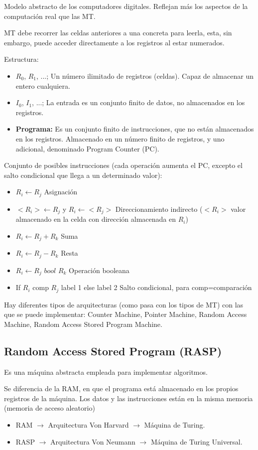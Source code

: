 Modelo abstracto de los computadores digitales. Reflejan más los aspectos de la computación real que las MT.

MT debe recorrer las celdas anteriores a una concreta para leerla, esta, sin embargo, puede acceder directamente a los registros al estar numerados.

Estructura:
\begin{itemize}
    \item $R_0$, $R_1$, ...; Un número ilimitado de registros (celdas). Capaz de almacenar un entero cualquiera.
    \item $I_0$, $I_1$, ...; La entrada es un conjunto finito de datos, no almacenados en los registros.
    \item \textbf{Programa:} Es un conjunto finito de instrucciones, que no están almacenados en los registros. Almacenado en un número finito de registros, y uno adicional, denominado Program Counter (PC).
\end{itemize}

Conjunto de posibles instrucciones (cada operación aumenta el PC, excepto el salto condicional que llega a un determinado valor):
\begin{itemize}
    \item $R_i \leftarrow R_j$ Asignación
    \item $<R_i> \leftarrow R_j$ y $R_i \leftarrow <R_j>$ Direccionamiento indirecto ($<R_i>$ valor almacenado en la celda con dirección almacenada en $R_i$)
    \item $R_i \leftarrow R_j + R_k$ Suma
    \item $R_i \leftarrow R_j - R_k$ Resta
    \item $R_i \leftarrow R_j \textit{ bool } R_k$ Operación booleana
    \item If $R_i$ comp $R_j$ label 1 else label 2 Salto condicional, para comp=comparación
\end{itemize}

Hay diferentes tipos de arquitecturas (como pasa con los tipos de MT) con las que se puede implementar: Counter Machine, Pointer Machine, Random Access Machine, Random Access Stored Program Machine.

\subsection{Random Access Stored Program (RASP)}
Es una máquina abstracta empleada para implementar algoritmos.

Se diferencia de la RAM, en que el programa está almacenado en los propios registros de la máquina. Los datos y las instrucciones están en la misma memoria (memoria de acceso aleatorio)
\begin{itemize}
    \item RAM $\rightarrow$ Arquitectura Von Harvard $\rightarrow$ Máquina de Turing.
    \item RASP $\rightarrow$ Arquitectura Von Neumann $\rightarrow$ Máquina de Turing Universal.
\end{itemize}

